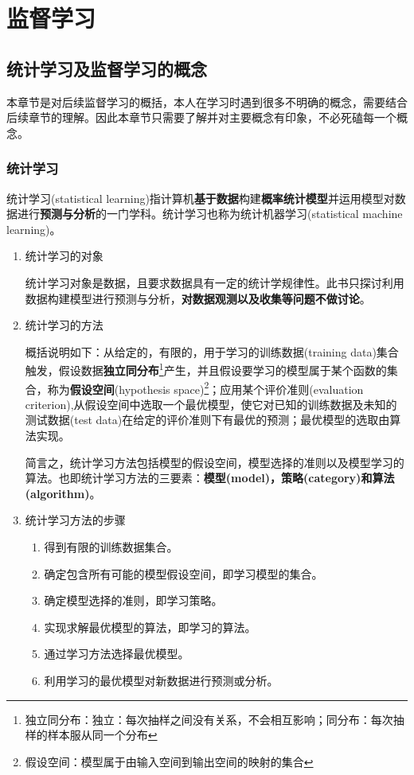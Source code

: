 \chapter{监督学习}

\section{统计学习及监督学习的概念}

本章节是对后续监督学习的概括，本人在学习时遇到很多不明确的概念，需要结合后续章节的理解。因此本章节只需要了解并对主要概念有印象，不必死磕每一个概念。

\subsection{统计学习}

统计学习(statistical learning)指计算机\textbf{基于数据}构建\textbf{概率统计模型}并运用模型对数据进行\textbf{预测与分析}的一门学科。统计学习也称为统计机器学习(statistical machine learning)。
\begin{enumerate}[itemindent=1em]
    \item 统计学习的对象 
    
    统计学习对象是数据，且要求数据具有一定的统计学规律性。此书只探讨利用数据构建模型进行预测与分析，\textbf{对数据观测以及收集等问题不做讨论}。
    \item 统计学习的方法 

    概括说明如下：从给定的，有限的，用于学习的训练数据(training data)集合触发，假设数据\textbf{独立同分布}\footnote{独立同分布：独立：每次抽样之间没有关系，不会相互影响；同分布：每次抽样的样本服从同一个分布}产生，并且假设要学习的模型属于某个函数的集合，称为\textbf{假设空间}(hypothesis space)\footnote{假设空间：模型属于由输入空间到输出空间的映射的集合}；应用某个评价准则(evaluation criterion),从假设空间中选取一个最优模型，使它对已知的训练数据及未知的测试数据(test data)在给定的评价准则下有最优的预测；最优模型的选取由算法实现。

    简言之，统计学习方法包括模型的假设空间，模型选择的准则以及模型学习的算法。也即统计学习方法的三要素：\textbf{模型(model)，策略(category)和算法(algorithm)}。
    \item 统计学习方法的步骤 
    \begin{enumerate}[itemindent=1em]
        \item 得到有限的训练数据集合。
        \item 确定包含所有可能的模型假设空间，即学习模型的集合。
        \item 确定模型选择的准则，即学习策略。
        \item 实现求解最优模型的算法，即学习的算法。
        \item 通过学习方法选择最优模型。
        \item 利用学习的最优模型对新数据进行预测或分析。
    \end{enumerate}
\end{enumerate}

